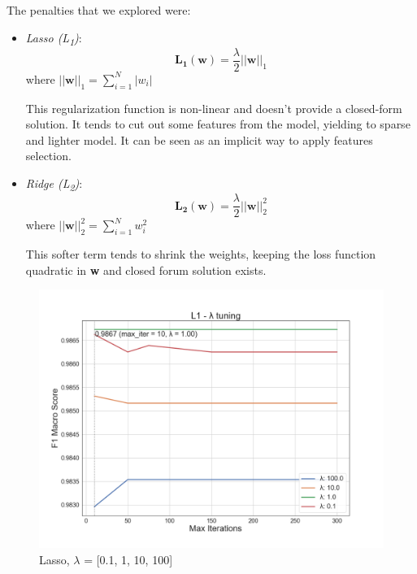 The penalties that we explored were:
\begin{itemize}
	\item[\PencilRight] \textit{Lasso (L\textsubscript{1})}:
	\[ \mathbf{L_{1}(w) }= \frac{\lambda}{2} ||\mathbf{w}||_{1} \]
	where $ ||\mathbf{w}||_{1} = \sum_{i=1}^{N}|w_{i}| $
	
	This regularization function is non-linear and doesn't provide a closed-form solution. It tends to cut out some features from the model, yielding to sparse and lighter model. It can be seen as an implicit way to apply features selection.
	
	\item[\PencilRight] \textit{Ridge (L\textsubscript{2})}:
	\[ \mathbf{L_{2}(w) }= \frac{\lambda}{2} ||\mathbf{w}||^{2}_{2} \]
	where $ ||\mathbf{w}||^{2}_{2} = \sum_{i=1}^{N}w_{i}^{2} $
	
	This softer term tends to shrink the weights, keeping the loss function quadratic in \textbf{w} and closed forum solution exists.
\end{itemize}
\begin{figure}
	\includegraphics[width=\columnwidth]{chapter5/figure/logreg_l1_lambda.png}\par 
	\caption{Lasso, $ \lambda$ = [0.1, 1, 10, 100]}
	\label{fig:lr_lasso_lambda}
\end{figure}
